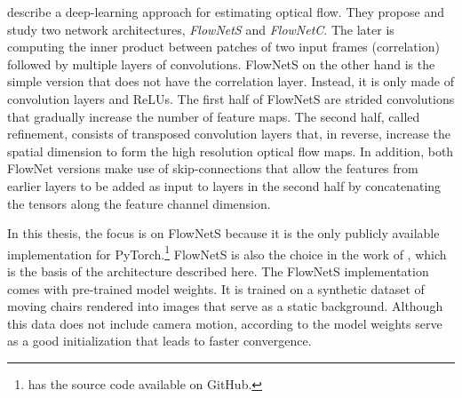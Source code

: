 			\cite{dosovitskiy2015flownet} describe a deep-learning approach for estimating optical flow.
			They propose and study two network architectures, \emph{FlowNetS} and \emph{FlowNetC}.
			The later is computing the inner product between patches of two input frames (correlation) followed by multiple layers of convolutions.
			FlowNetS on the other hand is the simple version that does not have the correlation layer. 
			Instead, it is only made of convolution layers and ReLUs.
			The first half of FlowNetS are strided convolutions that gradually increase the number of feature maps. 
			The second half, called refinement, consists of transposed convolution layers that, in reverse, increase the spatial dimension to form the high resolution optical flow maps.
			In addition, both FlowNet versions make use of skip-connections that allow the features from earlier layers to be added as input to layers in the second half by concatenating the tensors along the feature channel dimension. 
			
			In this thesis, the focus is on FlowNetS because it is the only publicly available implementation for PyTorch.\footnote{\citet*{flownetpytorch} has the source code available on GitHub.}
			FlowNetS is also the choice in the work of \citeauthor{wang2017deepvo}, which is the basis of the architecture described here.
			The FlowNetS implementation comes with pre-trained model weights.
			It is trained on a synthetic dataset of moving chairs rendered into images that serve as a static background.
			Although this data does not include camera motion, according to \citeauthor{wang2017deepvo} the model weights serve as a good initialization that leads to faster convergence. 
			
